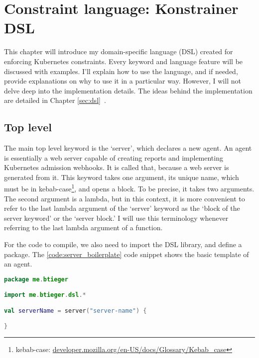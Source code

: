 \setlength{\parindent}{0pt}
\setlength{\parskip}{0.6em}

\chapter[Constraint language]{Constraint language: Konstrainer DSL}
\label{chap:konst_dsl}

This chapter will introduce my domain-specific language (DSL) created for enforcing Kubernetes constraints. Every keyword and language feature will be discussed with examples. I'll explain how to use the language, and if needed, provide explanations on why to use it in a particular way. However, I will not delve deep into the implementation details. The ideas behind the implementation are detailed in Chapter \ref{sec:dsl}~.

\section{Top level}

The main top level keyword is the `server', which declares a new agent. An agent is essentially a web server capable of creating reports and implementing Kubernetes admission webhooks. It is called that, because a web server is generated from it. This keyword takes one argument, its unique name, which must be in kebab-case\footnote{kebab-case: \url{developer.mozilla.org/en-US/docs/Glossary/Kebab_case}}, and opens a block. To be precise, it takes two arguments. The second argument is a lambda, but in this context, it is more convenient to refer to the last lambda argument of the `server' keyword as the `block of the server keyword' or the `server block.' I will use this terminology whenever referring to the last lambda argument of a function.

For the code to compile, we also need to import the DSL library, and define a package. The \ref{code:server_boilerplate} code snippet shows the basic template of an agent.

\begin{lstlisting}[caption={Template of a DSL script},language=Kotlin,label=code:server_boilerplate]
package me.btieger

import me.btieger.dsl.*

val serverName = server("server-name") {

}
\end{lstlisting}

